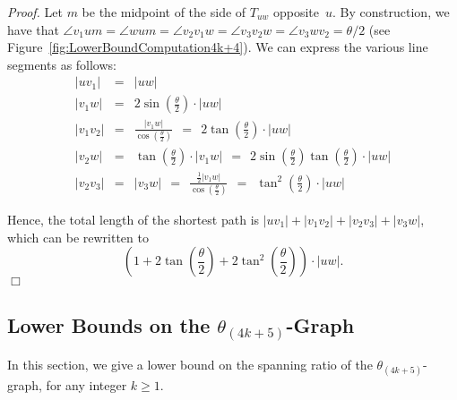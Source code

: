 \documentclass[12pt]{article}
\newenvironment{proof}{\emph{Proof.}}{\hfill $\Box$\\}
\newcommand{\Graph}[1]{\ensuremath{\theta_{(4 k + #1)}}-Graph\xspace}
\newcommand{\graph}[1]{\ensuremath{\theta_{(4 k + #1)}}-graph\xspace}
\newcommand{\canon}[2]{\ensuremath{T_{#1 #2}}}
\begin{document}
\begin{proof}
Let $m$ be the midpoint of the side of \canon{u}{w} opposite~$u$. By construction, we have that $\angle v_1 u m = \angle w u m = \angle v_2 v_1 w = \angle v_3 v_2 w = \angle v_3 w v_2 = \theta/2$ (see Figure~\ref{fig:LowerBoundComputation4k+4}). We can express the various line segments as follows: 
\begin{eqnarray*}
  |u v_1| &=& |u w| \\
  |v_1 w| &=& 2 \sin \left( \frac{\theta}{2} \right) \cdot |u w| \\
  |v_1 v_2| &=& \frac{|v_1 w|}{\cos \left( \frac{\theta}{2} \right)} ~~=~~ 2 \tan \left( \frac{\theta}{2} \right) \cdot |u w| \\
  |v_2 w| &=& \tan \left( \frac{\theta}{2} \right) \cdot |v_1 w| ~~=~~ 2 \sin \left( \frac{\theta}{2} \right) \tan \left( \frac{\theta}{2} \right) \cdot |u w| \\
  |v_2 v_3| &=& |v_3 w| ~~=~~ \frac{\frac{1}{2}|v_1 w|}{\cos \left( \frac{\theta}{2} \right)} ~~=~~ \tan^2 \left( \frac{\theta}{2} \right) \cdot |u w| 
\end{eqnarray*}

Hence, the total length of the shortest path is $|u v_1| + |v_1 v_2| + |v_2 v_3| + |v_3 w|$, which can be rewritten to \[\left( 1 + 2 \tan \left( \frac{\theta}{2} \right) + 2 \tan^2 \left( \frac{\theta}{2} \right) \right) \cdot |u w|.\]  
\end{proof}


\subsection{Lower Bounds on the \Graph{5}}
In this section, we give a lower bound on the spanning ratio of the \graph{5}, for any integer $k \geq 1$. 
\end{document}
